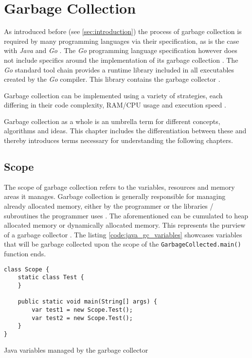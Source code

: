 \chapter{Garbage Collection}
\label{sec:overview}

As introduced before (see \autoref{sec:introduction}) the process of garbage
collection is required by many programming languages via their specification,
as is the case with \textit{Java} \cite[Chapter 1.
Introduction]{java_language_spec_2023} and \textit{Go}
\cite[Introduction]{go_spec_2023}. The \textit{Go} programming language
specification however does not include specifics around the implementation of
its garbage collection \cite[Introduction]{go_gcguide_2022}. The \textit{Go}
standard tool chain provides a runtime library included in all executables
created by the \textit{Go} compiler. This library contains the garbage
collector \cite[Introduction]{go_gcguide_2022}.


Garbage collection can be implemented using a variety of strategies, each
differing in their code complexity, RAM/CPU usage and execution speed \cite[4.3
Benchmarks]{gc-performance_2004} \cite[Motivation and Historical
Perspective]{gc-hardware_2018}.

Garbage collection as a whole is an umbrella term for different concepts,
algorithms and ideas. This chapter includes the differentiation between these
and thereby introduces terms necessary for understanding the following
chapters. 


\section{Scope}
\label{sec:scope}

The scope of garbage collection refers to the variables, resources and memory
areas it manages. Garbage collection is generally responsible for managing
already allocated memory, either by the programmer or the libraries /
subroutines the programmer uses \cite[Abstract]{learned-gc_2020}. The
aforementioned can be cumulated to heap allocated memory or dynamically
allocated memory. This represents the purview of a garbage collector \cite[1
Introduction]{age-based-gc_1999}. The listing \autoref{code:java_gc_variables}
showcases variables that will be garbage collected upon the scope of the
\texttt{GarbageCollected.main()} function ends.

\begin{listing}[H] 
    \begin{verbatim} 
class Scope {
    static class Test {
    }

    public static void main(String[] args) {
        var test1 = new Scope.Test();
        var test2 = new Scope.Test();
    }
}
    \end{verbatim}
    \caption{Java variables managed by the garbage collector}
    \label{code:java_gc_variables}
\end{listing}

